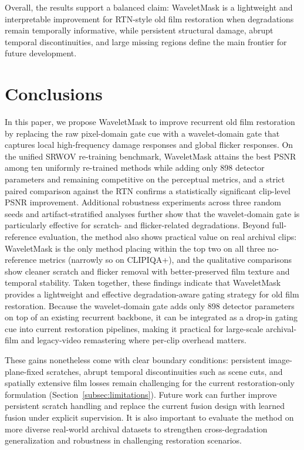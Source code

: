 \documentclass[applsci,article,submit,pdftex,moreauthors]{Definitions/mdpi}
\begin{document}
Overall, the results support a balanced claim: WaveletMask is a lightweight and interpretable improvement for RTN-style old film restoration when degradations remain temporally informative, while persistent structural damage, abrupt temporal discontinuities, and large missing regions define the main frontier for future development.

\section{Conclusions}\label{sec:conclusions}

In this paper, we propose WaveletMask to improve recurrent old film restoration by replacing the raw pixel-domain gate cue with a wavelet-domain gate that captures local high-frequency damage responses and global flicker responses. On the unified SRWOV re-training benchmark, WaveletMask attains the best PSNR among ten uniformly re-trained methods while adding only 898 detector parameters and remaining competitive on the perceptual metrics, and a strict paired comparison against the RTN confirms a statistically significant clip-level PSNR improvement. Additional robustness experiments across three random seeds and artifact-stratified analyses further show that the wavelet-domain gate is particularly effective for scratch- and flicker-related degradations. Beyond full-reference evaluation, the method also shows practical value on real archival clips: WaveletMask is the only method placing within the top two on all three no-reference metrics (narrowly so on CLIPIQA+), and the qualitative comparisons show cleaner scratch and flicker removal with better-preserved film texture and temporal stability. Taken together, these findings indicate that WaveletMask provides a lightweight and effective degradation-aware gating strategy for old film restoration. Because the wavelet-domain gate adds only 898 detector parameters on top of an existing recurrent backbone, it can be integrated as a drop-in gating cue into current restoration pipelines, making it practical for large-scale archival-film and legacy-video remastering where per-clip overhead matters.

These gains nonetheless come with clear boundary conditions: persistent image-plane-fixed scratches, abrupt temporal discontinuities such as scene cuts, and spatially extensive film losses remain challenging for the current restoration-only formulation (Section~\ref{subsec:limitations}). Future work can further improve persistent scratch handling and replace the current fusion design with learned fusion under explicit supervision. It is also important to evaluate the method on more diverse real-world archival datasets to strengthen cross-degradation generalization and robustness in challenging restoration scenarios.
\end{document}
